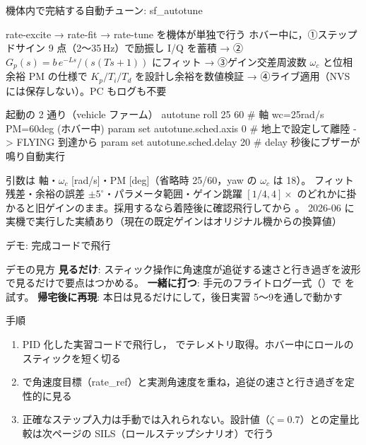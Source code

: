 \begin{frame}[fragile]{機体内で完結する自動チューン: sf\_autotune\later}
  \begin{block}{rate-excite → rate-fit → rate-tune を機体が単独で行う}\footnotesize
    ホバー中に，①ステップドサイン 9 点（2〜35\,Hz）で励振し I/Q を蓄積 →
    ②$G_p(s)=b\,e^{-Ls}/(s(Ts+1))$ にフィット → ③ゲイン交差周波数 $\omega_c$ と位相余裕 PM の仕様で $K_p/T_i/T_d$ を設計し余裕を数値検証 →
    ④ライブ適用（NVS には保存しない）。PC もログも不要
  \end{block}

  \begin{sflisting}[basicstyle=\ttfamily\scriptsize]{起動の 2 通り（vehicle ファーム）}
autotune roll 25 60                  # 軸 wc=25rad/s PM=60deg (ホバー中)
param set autotune.sched.axis 0      # 地上で設定して離陸 -> FLYING 到達から
param set autotune.sched.delay 20    #   delay 秒後にブザーが鳴り自動実行
  \end{sflisting}

  \vspace{-0.3em}
  {\scriptsize 引数は 軸・$\omega_c$ [rad/s]・PM [deg]（省略時 25/60，yaw の $\omega_c$ は 18）。
   フィット残差・余裕の誤差 $\pm5^\circ$・パラメータ範囲・ゲイン跳躍 $[1/4, 4]\times$
  のどれかに掛かると旧ゲインのまま。採用するなら着陸後に確認飛行してから 。
  2026-06 に実機で実行した実績あり（現在の既定ゲインはオリジナル機からの換算値）}
\end{frame}


\begin{frame}{デモ: 完成コードで飛行}
  \begin{exampleblock}{デモの見方}\footnotesize
    \textbf{見るだけ}: スティック操作に角速度が追従する速さと行き過ぎを波形で見るだけで要点はつかめる。
    \textbf{一緒に打つ}: 手元のフライトログ一式（）で  を試す。
    \textbf{帰宅後に再現}: 本日は見るだけにして，後日実習 5〜9を通しで動かす
  \end{exampleblock}

  \begin{block}{手順}\footnotesize
    \begin{enumerate}
      \item PID 化した実習コードで飛行し， でテレメトリ取得。ホバー中にロールのスティックを短く切る
      \item {} で角速度目標（rate\_ref）と実測角速度を重ね，追従の速さと行き過ぎを定性的に見る
      \item 正確なステップ入力は手動では入れられない。設計値（$\zeta=0.7$）との定量比較は次ページの SILS（ロールステップシナリオ）で行う
    \end{enumerate}
  \end{block}
\end{frame}

